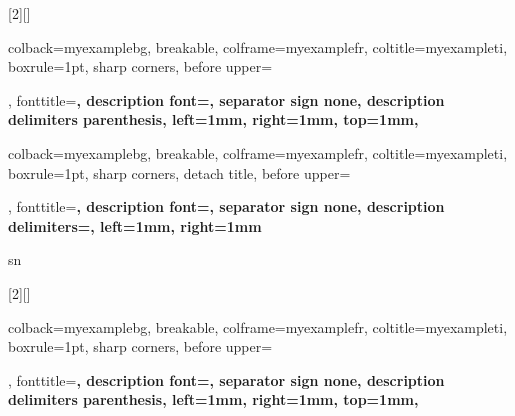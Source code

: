 [2][]{%
  colback=myexamplebg,
  breakable,
  colframe=myexamplefr,
  coltitle=myexampleti,
  boxrule=1pt,
  sharp corners,
  before upper={\renewcommand{\familydefault}{\sfdefault}\selectfont\tcbtitle\par\smallskip},
  fonttitle=\bfseries\sffamily,
  description font=\mdseries,
  separator sign none,
  description delimiters parenthesis,
  left=1mm, %
  right=1mm, %
  top=1mm,
}

{colback=myexamplebg, breakable, colframe=myexamplefr, coltitle=myexampleti,
  boxrule=1pt, sharp corners, detach title,
  before upper={\renewcommand{\familydefault}{\sfdefault}\selectfont\tcbtitle\par\smallskip},
  fonttitle=\bfseries\sffamily, description font=\mdseries,
  separator sign none, description delimiters={}, %
  left=1mm, %
  right=1mm %
}{sn}


[2][]{%
  colback=myexamplebg,
  breakable,
  colframe=myexamplefr,
  coltitle=myexampleti,
  boxrule=1pt,
  sharp corners,
  before upper={\renewcommand{\familydefault}{\sfdefault}\selectfont\tcbtitle\par\smallskip},
  fonttitle=\bfseries\sffamily,
  description font=\mdseries,
  separator sign none,
  description delimiters parenthesis,
  left=1mm, %
  right=1mm, %
  top=1mm,
}

\newcommand{\thm}[3][]{\begin{Theorem}{#2}{#1}#3\end{Theorem}}
\newcommand{\cor}[3][]{\begin{corollary}{#2}{#1}#3\end{corollary}}
\newcommand{\lem}[3][]{\begin{lemma}{#2}{#1}#3\end{lemma}}
\newcommand{\clm}[3][]{\begin{claim}{#2}{#1}#3\end{claim}}
\newcommand{\ex}[3][]{\begin{Example}{#2}{#1}#3\end{Example}}
\newcommand{\hl}[2][]{\begin{highlightbox}{#1}#2\end{highlightbox}}
\newcommand{\sn}[3][]{\begin{sidenotebox}{#2}{#1}#3\end{sidenotebox}}
\newcommand{\sns}[3][]{\begin{sidenoteboxsmall}{#2}{#1}#3\end{sidenoteboxsmall}}
\newcommand{\hls}[2][]{\begin{highlightboxsmall}{#1}#2\end{highlightboxsmall}}


